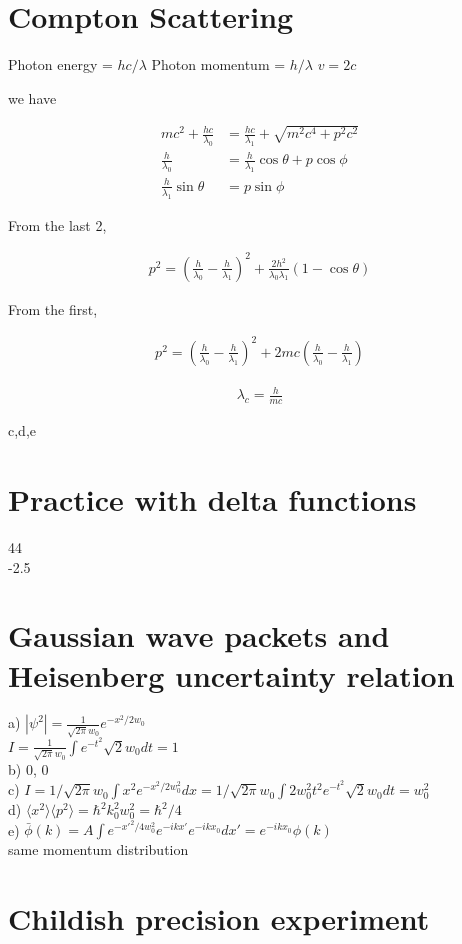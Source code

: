 \documentclass{article}
\title{}
\date{}
\newcommand{\<}{\langle}
\renewcommand{\>}{\rangle}
\begin{document}
\maketitle

\section{Compton Scattering}

Photon energy = $hc/\lambda$
Photon momentum = $h/\lambda$
$v = 2c$

we have

\begin{align*}
mc^2 + \frac{hc}{\lambda_0} &= \frac{hc}{\lambda_1} + \sqrt{m^2c^4 + p^2c^2} \\
\frac{h}{\lambda_0} &= \frac{h}{\lambda_1} \cos\theta + p\cos\phi \\
\frac{h}{\lambda_1} \sin\theta &= p\sin\phi
\end{align*}

From the last 2,

\begin{align*}
p^2 = \left(\frac{h}{\lambda_0} - \frac{h}{\lambda_1}\right)^2 + \frac{2h^2}{\lambda_0\lambda_1}(1-\cos\theta)
\end{align*}

From the first,

\begin{align*}
p^2 = \left(\frac{h}{\lambda_0} - \frac{h}{\lambda_1}\right)^2 + 2mc\left(\frac{h}{\lambda_0} - \frac{h}{\lambda_1}\right)
\end{align*}

\begin{align*}
\lambda_c = \frac{h}{mc}
\end{align*}

c,d,e

\section{Practice with delta functions}

44
\\
-2.5

\section{Gaussian wave packets and Heisenberg uncertainty relation}

a) $|\psi^2| = \frac{1}{\sqrt{2\pi} w_0} e^{-x^2/2w_0}$ \\
$I = \frac{1}{\sqrt{2\pi} w_0} \int e^{-t^2} \sqrt 2 w_0 dt = 1$
\\
b) 0, 0
\\
c) $I = 1/\sqrt{2\pi}w_0 \int x^2 e^{-x^2/2w_0^2} dx = 1/\sqrt{2\pi}w_0 \int 2w_0^2t^2 e^{-t^2} \sqrt 2 w_0 dt = w_0^2$
\\
d) $\<x^2\> \<p^2\> = \hbar^2 k_0^2 w_0^2 = \hbar^2 / 4$
\\
e) $\bar\phi(k) = A\int e^{-x'^2/4w_0^2} e^{-ikx'}e^{-ikx_0} dx' = e^{-ikx_0}\phi(k)$ \\
same momentum distribution

\section{Childish precision experiment}
\end{document}
